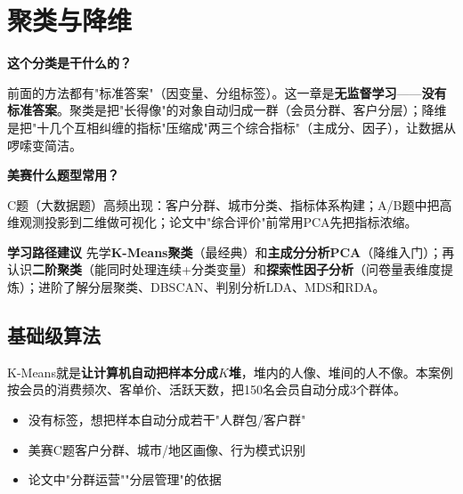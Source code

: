 \chapter{聚类与降维}

\begin{chapteroverview}
\textbf{这个分类是干什么的？}

前面的方法都有"标准答案"（因变量、分组标签）。这一章是\textbf{无监督学习}——\textbf{没有标准答案}。聚类是把"长得像"的对象自动归成一群（会员分群、客户分层）；降维是把"十几个互相纠缠的指标"压缩成"两三个综合指标"（主成分、因子），让数据从啰嗦变简洁。

\textbf{美赛什么题型常用？}

C题（大数据题）高频出现：客户分群、城市分类、指标体系构建；A/B题中把高维观测投影到二维做可视化；论文中"综合评价"前常用PCA先把指标浓缩。

\textbf{学习路径建议}
先学\textbf{K-Means聚类}（最经典）和\textbf{主成分分析PCA}（降维入门）；再认识\textbf{二阶聚类}（能同时处理连续+分类变量）和\textbf{探索性因子分析}（问卷量表维度提炼）；进阶了解分层聚类、DBSCAN、判别分析LDA、MDS和RDA。
\end{chapteroverview}

\section{基础级算法}


\begin{algointro}
K-Means就是\textbf{让计算机自动把样本分成$K$堆}，堆内的人像、堆间的人不像。本案例按会员的消费频次、客单价、活跃天数，把150名会员自动分成3个群体。
\end{algointro}

\begin{algoscene}
\begin{itemize}
    \item 没有标签，想把样本自动分成若干"人群包/客户群"
    \item 美赛C题客户分群、城市/地区画像、行为模式识别
    \item 论文中"分群运营""分层管理"的依据
\end{itemize}
\end{algoscene}

